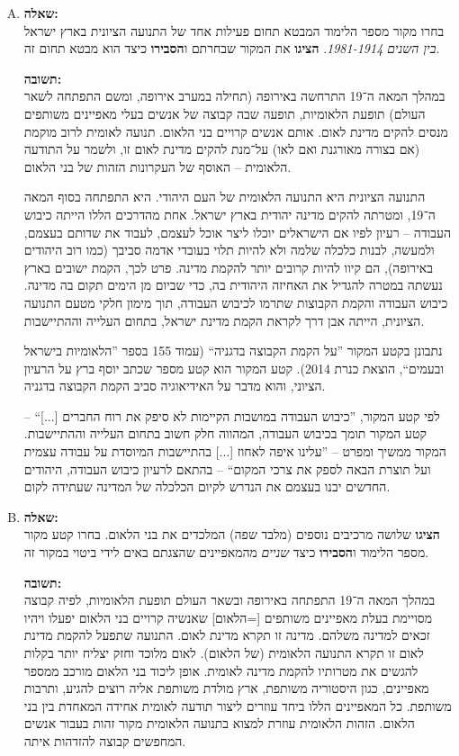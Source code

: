 \documentclass[a4paper]{article}
\newcommand\hl[1]   {#1}
\begin{document}
\begin{enumerate}[A.]
			\item \textbf{שאלה: }\\
			בחרו מקור מספר הלימוד המבטא תחום פעילות אחד של התנועה הציונית בארץ ישראל \textit{בין השנים 1981-1914}. \textbf{הציגו} את המקור שבחרתם ו\textbf{הסבירו} כיצד הוא מבטא תחום זה. 
			
			\textbf{תשובה: }\\ 
			במהלך המאה ה־19 התרחשה באירופה (תחילה במערב אירופה, ומשם התפתחה לשאר העולם) תופעת הלאומיות, תופעה שבה קבוצה של אנשים בעלי מאפיינים משותפים מנסים להקים מדינת לאום. אותם אנשים קרויים בני הלאום. תנועה לאומית לרוב מוקמת (אם בצורה מאורגנת ואם לאו) על־מנת להקים מדינת לאום זו, ולשמר על התודעה הלאומית – האוסף של העקרונות הזהות של בני הלאום. 
			
			התנועה הציונית היא התנועה הלאומית של העם היהודי. היא התפתחה בסוף המאה ה־19, ומטרתה להקים מדינה יהודית בארץ ישראל. אחת מהדרכים הללו הייתה כיבוש העבודה – רעיון לפיו אם הישראלים יוכלו ליצר אוכל לעצמם, לעבוד את שדותם בעצמם, ולמעשה, לבנות כלכלה שלמה ולא להיות תלוי בעובדי אדמה סביבך (כמו רוב היהודים באירופה), הם קיוו להיות קרובים יותר להקמת מדינה. פרט לכך, הקמת ישובים בארץ נעשתה במטרה להגדיל את האחיזה היהודית בה, כדי שביום מן הימים תקום בה מדינה. כיבוש העבודה והקמת הקבוצות שתרמו לכיבוש העבודה, תוך מימון חלקי מטעם התנועה הציונית, הייתה אבן דרך לקראת הקמת מדינת ישראל, בתחום העלייה וההתיישבות. 
			
			נתבונן בקטע המקור ''על הקמת הקבוצה בדגניה`` (עמוד 155 בספר ''הלאומיות בישראל ובעמים``, הוצאת כנרת 2014). קטע המקור הוא קטע מספר שכתב יוסף ברץ על הרעיון הציוני, והוא מדבר על האידיאוגיה סביב הקמת הקבוצה בדגניה. 
			
			לפי קטע המקור, ''כיבוש העבודה במושבות הקיימות לא סיפק את רוח החברים [...]`` – קטע המקור תומך בכיבוש העבודה, המהווה חלק חשוב בתחום העלייה וההתיישבות. המקור ממשיך ומפרט – ''עלינו איפה לאחוז [...] בהתיישבות המיוסדת על עבודה עצמית ועל תוצרת הבאה לספק את צרכי המקום`` – בהתאם לרעיון כיבוש העבודה, היהודים החדשים יבנו בעצמם את הנדרש לקיום הכלכלה של המדינה שעתידה לקום. 
			
			\item \textbf{שאלה: }\\
			\textbf{הציגו} שלושה מרכיבים נוספים (מלבד שפה) המלכדים את בני הלאום. בחרו קטע מקור מספר הלימוד ו\textbf{הסבירו} כיצד \textit{שניים} מהמאפיינים שהצגתם באים לידי ביטוי במקור זה. 
			
			\textbf{תשובה: }\\
			במהלך המאה ה־19 התפתחה באירופה ובשאר העולם תופעת ה\hl{לאומיות}, לפיה קבוצה מסויימת בעלת מאפיינים משותפים [=\hl{הלאום}] שאנשיה קרויים \hl{בני הלאום} יפעלו ויהיו זכאים למדינה משלהם. מדינה זו תקרא \hl{מדינת לאום}. התנועה שתפעל להקמת מדינת לאום זו תקרא \hl{התנועה הלאומית} (של הלאום). לאום מלוכד וחזק יצליח יותר בקלות להגשים את מטרותיו להקמת מדינה לאומית. אופן ליכוד בני הלאום מורכב ממספר מאפיינים, כגון היסטוריה משותפת, ארץ מולדת משותפת אליה רוצים להגיע, ותרבות משותפת. כל המאפיינים הללו ביחד עוזרים ליצור \hl{תודעה לאומית} אחידה המאחדת בין בני הלאום. הזהות הלאומית עוזרת למצוא בתנועה הלאומית מקור זהות בעבור אנשים המחפשים קבוצה להזדהות איתה. 
			

\end{enumerate}
\end{document}
